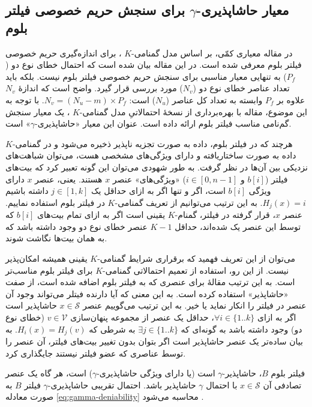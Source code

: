 \subsection{معیار 
	حاشاپذیری-$\gamma$ برای
	سنجش حریم خصوصی فیلتر بلوم}
\label{gamma-deniability}

در مقاله \cite{Bianchi2012} معیاری کمّی، بر اساس مدل گمنامی-$K$ 
\cite{Sweeney2002}،
برای اندازه‌گیری حریم خصوصی فیلتر بلوم معرفی شده است. در این مقاله بیان شده است که احتمال خطای نوع دو ($P_f$) به تنهایی معیار مناسبی برای سنجش حریم خصوصی فیلتر بلوم نیست. بلکه باید تعداد عناصر خطای نوع دو ($N_v$) مورد بررسی قرار گیرد. واضح است که اندازهٔ $N_v$ علاوه بر $P_f$ وابسته به تعداد کل عناصر ($N_u$) است:
$N_v=(N_u-m)\times P_f$.
با توجه به این موضوع، مقاله \cite{Bianchi2012} با بهره‌برداری از نسخهٔ احتمالاتیِ مدل گمنامی-$K$
\cite{Lodha2008}،
یک معیار سنجش گم‌نامی مناسب فیلتر بلوم ارائه داده است. عنوان این معیار «حاشاپذیری-$\gamma$» است. 

هرچند که در فیلتر بلوم، داده به صورت تجزیه ناپذیر ذخیره می‌شود و در گمنامی-$K$ داده به صورت ساختاریافته و دارای ویژگی‌های مشخصی هست، می‌توان شباهت‌های نزدیکی بین آن‌ها در نظر گرفت. به طور شهودی می‌توان این گونه تعبیر کرد که بیت‌های فیلتر ($b[i]$ و $i\in[0,n-1]$) «ویژگی‌های» عنصر $x$ هستند. یعنی، عنصر $x$ دارای ویژگی $b[i]$ است، اگر و تنها اگر به ازای حداقل یک 
$j\in[1,k]$ داشته باشیم 
$H_j(x)=i$.
به این ترتیب می‌توانیم از تعریف گمنامی-$K$ در فیلتر بلوم استفاده نماییم. عنصر $x$، قرار گرفته در فیلتر، گمنام-$K$ یقینی است اگر به ازای تمام بیت‌های $b[i]$  که توسط این عنصر یک شده‌اند، حداقل $K-1$ عنصر خطای نوع دو وجود داشته باشد که به همان بیت‌ها نگاشت شوند.

می‌توان از این تعریف فهمید که برقراری شرایط گمنامی-$K$ یقینی همیشه امکان‌پذیر نیست. از این رو، استفاده از تعمیم احتمالاتی گمنامی-$K$ 
\cite{Lodha2008} 
برای فیلتر بلوم مناسب‌تر است. به این ترتیب مقالهٔ \cite{Bianchi2012} برای عنصری که به فیلتر بلوم اضافه شده است، از صفت «حاشاپذیر» استفاده کرده است.  به این معنی که آیا دارنده فیتلر می‌تواند وجود آن عنصر در فیلتر را انکار نماید یا خیر. به این ترتیب می‌گوییم عنصر $x\in \mathcal{S}$ حاشاپذیر است اگر به ازای 
$\forall i \in \{1..k\}$،
حداقل یک عنصر از مجموعه پنهان‌سازی $v\in \mathcal{V}$ (خطای نوع دو) وجود داشته باشد به گونه‌ای که 
$\exists j \in \{1..k\}$
به شرطی که 
$H_i(x) = H_j(v)$.
به بیان ساده‌تر یک عنصر حاشا‌پذیر است اگر بتوان بدون تغییر بیت‌های فیلتر، آن عنصر را توسط عناصری که عضو فیلتر نیستند جایگذاری کرد. 

فیلتر بلوم $B$، حاشاپذیر-$\gamma$ است (یا دارای ویژگی حاشاپذیری-$\gamma$) است، هر گاه یک عنصر تصادفی آن $x\in \mathcal{S}$ با احتمال $\gamma$ حاشاپذیر باشد. احتمال تقریبی حاشاپذیری-$\gamma$ فیلتر $B$ به صورت معادله \eqref{eq:gamma-deniability} محاسبه می‌شود  \cite{Bianchi2012}.


